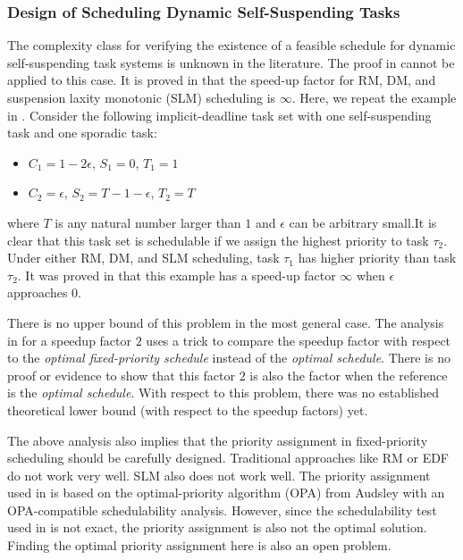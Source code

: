 \subsubsection{Design of Scheduling Dynamic Self-Suspending Tasks}
The complexity class for verifying the existence of a feasible schedule for dynamic self-suspending task systems is unknown in the literature. The proof in \cite{Ridouard_2004} cannot be applied to this case. 
It is proved in \cite{huangpass:dac2015} that the speed-up factor for RM, DM, and suspension laxity monotonic (SLM) scheduling is $\infty$. Here, we repeat the example in \cite{huangpass:dac2015}. Consider the following implicit-deadline task set with one self-suspending task and one sporadic task:
\begin{itemize}
 \setlength\itemsep{0em}
\item $C_1=1-2\epsilon$, $S_1=0$, $T_1=1$
\item  $C_2=\epsilon$, $S_2=T-1-\epsilon$, $T_2=T$
\end{itemize}
where $T$ is any natural number larger than $1$ and $\epsilon$ can be arbitrary small.It is clear that this task set is schedulable if we assign the highest priority to
task $\tau_2$. Under either RM, DM, and SLM scheduling, task $\tau_1$ has higher priority than task $\tau_2$. It was proved in \cite{huangpass:dac2015} that this example has a speed-up factor $\infty$ when $\epsilon$ approaches $0$.

There is no upper bound of this problem in the most general case. The analysis in \cite{huangpass:dac2015} for a speedup factor $2$ uses a trick to compare the speedup factor with respect to the \emph{optimal fixed-priority schedule} instead of the \emph{optimal schedule}. There is no proof or evidence to show that this factor $2$ is also the factor when the reference is the \emph{optimal schedule}. With respect to this problem, there was no established theoretical lower bound (with respect to the speedup factors) yet.


The above analysis also implies that the priority assignment in fixed-priority scheduling should be carefully designed. Traditional approaches like RM or EDF do not work very well. SLM also does not work well. The priority assignment used in \cite{huangpass:dac2015} is based on the optimal-priority algorithm (OPA) from Audsley \cite{audsley-1993} with an OPA-compatible schedulability analysis. However, since the schedulability test used in \cite{huangpass:dac2015}  is not exact, the priority assignment is also not the optimal solution.
Finding the optimal priority assignment here is also an open problem.


